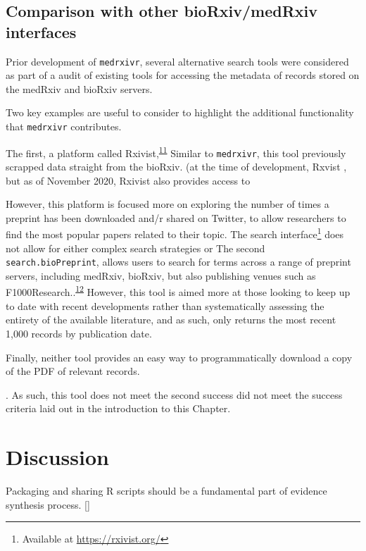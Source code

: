 \documentclass[a4paper, twoside]{templates/ociamthesis}
\begin{document}
\hypertarget{comparison-with-other-biorxivmedrxiv-interfaces}{%
\subsection{Comparison with other bioRxiv/medRxiv interfaces}\label{comparison-with-other-biorxivmedrxiv-interfaces}}

Prior development of \texttt{medrxivr}, several alternative search tools were considered as part of a audit of existing tools for accessing the metadata of records stored on the medRxiv and bioRxiv servers.

Two key examples are useful to consider to highlight the additional functionality that \texttt{medrxivr} contributes.

The first, a platform called Rxivist,\textsuperscript{\protect\hyperlink{ref-abdill2019}{11}} Similar to \texttt{medrxivr}, this tool previously scrapped data straight from the bioRxiv. (at the time of development, Rxvist , but as of November 2020, Rxivist also provides access to

However, this platform is focused more on exploring the number of times a preprint has been downloaded and/r shared on Twitter, to allow researchers to find the most popular papers related to their topic. The search interface\footnote{Available at \url{https://rxivist.org/}} does not allow for either complex search strategies or
The second \texttt{search.bioPreprint}, allows users to search for terms across a range of preprint servers, including medRxiv, bioRxiv, but also publishing venues such as F1000Research..\textsuperscript{\protect\hyperlink{ref-iwema2016}{12}} However, this tool is aimed more at those looking to keep up to date with recent developments rather than systematically assessing the entirety of the available literature, and as such, only returns the most recent 1,000 records by publication date.

Finally, neither tool provides an easy way to programmatically download a copy of the PDF of relevant records.

. As such, this tool does not meet the second success did not meet the success criteria laid out in the introduction to this Chapter.

\hypertarget{discussion}{%
\section{Discussion}\label{discussion}}

Packaging and sharing R scripts should be a fundamental part of evidence synthesis process. {[}{]}
\end{document}
